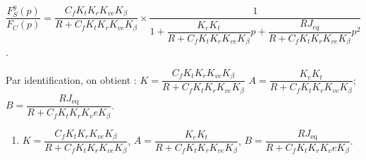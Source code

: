 \begin{corrigebox}
$\dfrac{F_S^y (p)}{F_C (p)}=\dfrac{C_f K_t K_r K_{ve} K_{\beta}}{R+C_f K_t K_r K_{ve} K_{\beta} } \times \dfrac{1}{1+\dfrac{K_e K_t}{R+C_f K_t K_r K_{ve} K_{\beta} }p+\dfrac{RJ_{eq}}{R+C_f K_t K_r K_{ve} K_{\beta} } p^2}$.

Par identification, on obtient :
$K=\dfrac{C_f K_t K_r K_{ve} K_{\beta}}{R+C_f K_t K_r K_{ve} K_{\beta}}$
$A=\dfrac{K_e K_t}{R+C_f K_t K_r K_{ve} K_{\beta} }$;
$B=\dfrac{RJ_{\text{eq}}}{R+C_f K_t K_r K_ve K_{\beta} }$.

\begin{enumerate}
\item $K=\dfrac{C_f K_t K_r K_{ve} K_{\beta}}{R+C_f K_t K_r K_{ve} K_{\beta}}$,
$A=\dfrac{K_e K_t}{R+C_f K_t K_r K_{ve} K_{\beta} }$,
$B=\dfrac{RJ_{\text{eq}}}{R+C_f K_t K_r K_ve K_{\beta} }$.
\end{enumerate}
\end{corrigebox}
